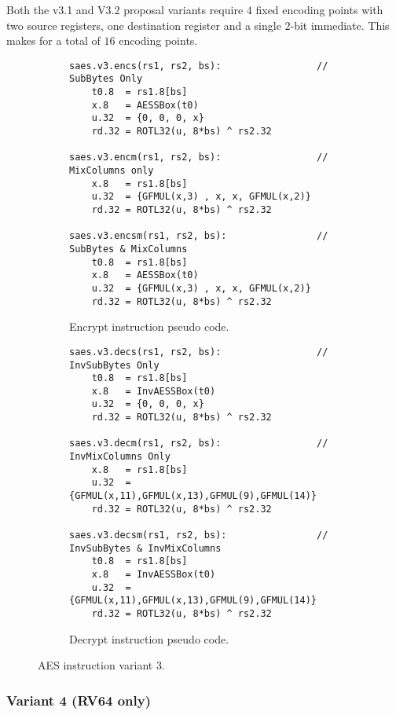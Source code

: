 Both the v3.1 and V3.2 proposal variants require $4$ fixed encoding
points with two source registers, one destination register and
a single $2$-bit immediate.
This makes for a total of $16$ encoding points.

\begin{figure}
\begin{subfigure}[b]{1.0\textwidth}
\begin{lstlisting}[language=pseudo]
saes.v3.encs(rs1, rs2, bs):                 // SubBytes Only
    t0.8  = rs1.8[bs]
    x.8   = AESSBox(t0)
    u.32  = {0, 0, 0, x}
    rd.32 = ROTL32(u, 8*bs) ^ rs2.32

saes.v3.encm(rs1, rs2, bs):                 // MixColumns only
    x.8   = rs1.8[bs]
    u.32  = {GFMUL(x,3) , x, x, GFMUL(x,2)}
    rd.32 = ROTL32(u, 8*bs) ^ rs2.32

saes.v3.encsm(rs1, rs2, bs):                // SubBytes & MixColumns
    t0.8  = rs1.8[bs]
    x.8   = AESSBox(t0)
    u.32  = {GFMUL(x,3) , x, x, GFMUL(x,2)}
    rd.32 = ROTL32(u, 8*bs) ^ rs2.32
\end{lstlisting}
\caption{Encrypt instruction pseudo code.}
\label{fig:pesudo:aes:v3:enc}
\end{subfigure}

\begin{subfigure}[b]{1.0\textwidth}
\begin{lstlisting}[language=pseudo]
saes.v3.decs(rs1, rs2, bs):                 // InvSubBytes Only
    t0.8  = rs1.8[bs]
    x.8   = InvAESSBox(t0)
    u.32  = {0, 0, 0, x}
    rd.32 = ROTL32(u, 8*bs) ^ rs2.32

saes.v3.decm(rs1, rs2, bs):                 // InvMixColumns Only
    x.8   = rs1.8[bs]
    u.32  = {GFMUL(x,11),GFMUL(x,13),GFMUL(9),GFMUL(14)}
    rd.32 = ROTL32(u, 8*bs) ^ rs2.32

saes.v3.decsm(rs1, rs2, bs):                // InvSubBytes & InvMixColumns
    t0.8  = rs1.8[bs]
    x.8   = InvAESSBox(t0)
    u.32  = {GFMUL(x,11),GFMUL(x,13),GFMUL(9),GFMUL(14)}
    rd.32 = ROTL32(u, 8*bs) ^ rs2.32
\end{lstlisting}
\caption{Decrypt instruction pseudo code.}
\label{fig:pesudo:aes:v3:dec}
\end{subfigure}
\caption{AES instruction variant 3.}
\label{fig:pseudo:aes:v3}
\end{figure}



\newpage
\subsubsection{Variant 4 (RV64 only)}

